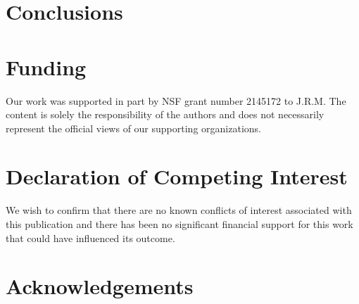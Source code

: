 \documentclass[preprint,12pt, a4paper]{elsarticle}
\begin{document}


\section{Conclusions}


\section*{Funding}
Our work was supported in part by NSF grant number 2145172 to J.R.M. The content is solely the responsibility of the authors and does not necessarily represent the official views of our supporting organizations.


\section*{Declaration of Competing Interest}
We wish to confirm that there are no known conflicts of interest associated with this publication and there has been no significant financial support for this work that could have influenced its outcome.


\section*{Acknowledgements}


 

\end{document}
